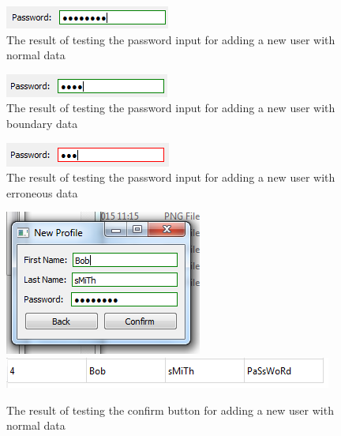 \begin{figure}[H]
	\includegraphics{./testing/images/test_1_5_password_input_normal.png}
	\caption{The result of testing the password input for adding a new user with normal data} \label{fig:test_1.5_result}
\end{figure}

\begin{figure}[H]
	\includegraphics{./testing/images/test_1_6_password_input_boundary.png}
	\caption{The result of testing the password input for adding a new user with boundary data} \label{fig:test_1.6_result}
\end{figure}

\begin{figure}[H]
	\includegraphics{./testing/images/test_1_7_password_input_erroneous.png}
	\caption{The result of testing the password input for adding a new user with erroneous data} \label{fig:test_1.7_result}
\end{figure}

\begin{figure}[H]
	\includegraphics{./testing/images/test_1_8_confirm_button_data.png}
	\includegraphics{./testing/images/test_1_8_confirm_button_data_added.png}
	\caption{The result of testing the confirm button for adding a new user with normal data} \label{fig:test_1.8_result}
\end{figure}

